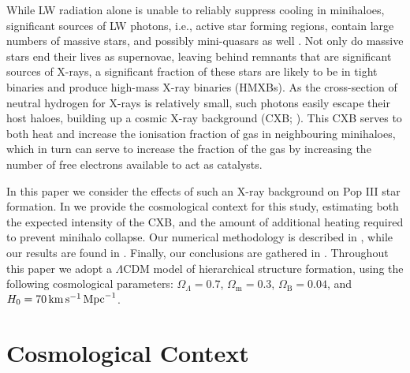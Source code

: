 \documentclass[../thesis.tex]{subfiles}
\begin{document}
While LW radiation alone is unable to reliably suppress \htwo cooling in minihaloes, significant sources of LW photons, i.e., active star forming regions, contain large numbers of massive stars, and possibly mini-quasars as well \citep{KuhlenMadau2005, Jeonetal2012, Jeonetal2014a}.  Not only do massive stars end their lives as supernovae, leaving behind remnants that are significant sources of X-rays, a significant fraction of these stars are likely to be in tight binaries \citep[e.g.,][]{Clarketal2011b,Greifetal2012, Mirocha2014} and produce high-mass X-ray binaries (HMXBs).  As the cross-section of neutral hydrogen for X-rays is relatively small, such photons easily escape their host haloes, building up a cosmic X-ray background (CXB; \citealt{Oh2001, HaimanAbelRees2000, VenkatesanGirouxShull2001, GloverBrand2003, Cen2003, KuhlenMadau2005, Jeonetal2012, Jeonetal2014a}). This CXB serves to both heat and increase the ionisation fraction of gas in neighbouring minihaloes, which in turn can serve to increase the \htwo fraction of the gas by increasing the number of free electrons available to act as catalysts.

In this paper we consider the effects of such an X-ray background on Pop III star formation.  In  we provide the cosmological context for this study, estimating both the expected intensity of the CXB, and the amount of additional heating required to prevent minihalo collapse. Our numerical methodology is described in , while our results are found in .  Finally, our conclusions are gathered in .
Throughout this paper we adopt
a $\Lambda$CDM model of hierarchical structure formation, using the following
cosmological parameters: $\Omega_{\Lambda} = 0.7$, $\Omega_{\mathrm m} = 0.3$, $\Omega_{\mathrm B} = 0.04$, and $H_0 = 70 \,\mathrm{km}\,\mathrm{s}^{-1} \,\mathrm{Mpc}^{-1}$.

\section{Cosmological Context}
\label{context}
\end{document}
